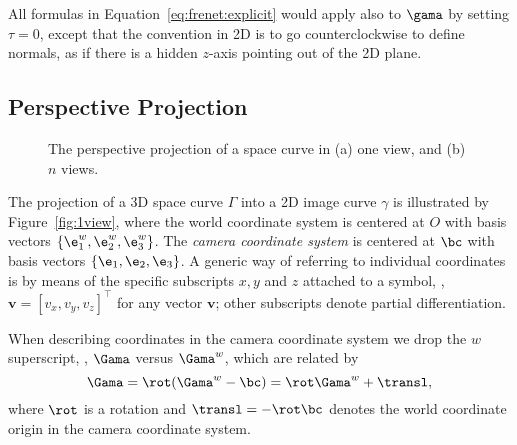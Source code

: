 \noindent All formulas in
Equation~\eqref{eq:frenet:explicit} would apply also to $\gama$ by
setting $\tau = 0$, except that the convention in 2D is to go counterclockwise to
define normals, as if there is a hidden $z$-axis pointing out of the 2D plane.

\subsection{Perspective Projection}
\begin{figure}
\centering
\caption{%
The perspective projection of a space curve in (a) one view, and
(b) $n$ views.
}
\end{figure}
The projection of a 3D space curve $\Gamma$ into a 2D image curve $\gamma$ is
illustrated by Figure~\ref{fig:1view},
where the world coordinate system is centered at $O$ with basis
vectors $\{\e_1^w, \e_2^w, \e_3^w\}$. The
\emph{camera coordinate system} is centered at $\bc$
with basis vectors $\{\e_1, \e_2, \e_3\}$. A generic way of referring to
individual coordinates is by means of the specific subscripts $x,y$ and $z$ attached
to a symbol, \ie, $\boldsymbol{v} = [v_x, v_y, v_z]^\top$ for any vector
$\boldsymbol v$; other subscripts denote partial differentiation.

When describing coordinates in the
camera coordinate system we drop the $w$ superscript, \eg, $\Gama$ versus
$\Gama^w$, which are related by
\begin{equation}\label{eq:coord:transf:RT}
\Gama = \rot (\Gama^w - \bc) = \rot\Gama^w + \transl,
\end{equation}
where $\rot$ is a rotation and $\transl = -\rot\bc$
denotes the world coordinate origin in the camera coordinate system.
%


